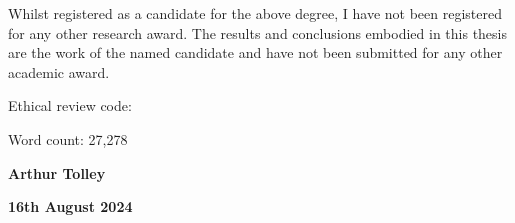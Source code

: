Whilst registered as a candidate for the above degree, I have not been registered for any other research award. The results and conclusions embodied in this thesis are the work of the named candidate and have not been submitted for any other academic award.

\vspace{\baselineskip}
\noindent Ethical review code: 

\vspace{\baselineskip}
\noindent Word count: 27,278

\noindent\hrulefill

\vspace{\baselineskip}
\noindent \textbf{Arthur Tolley}

\noindent \textbf{16th August 2024}